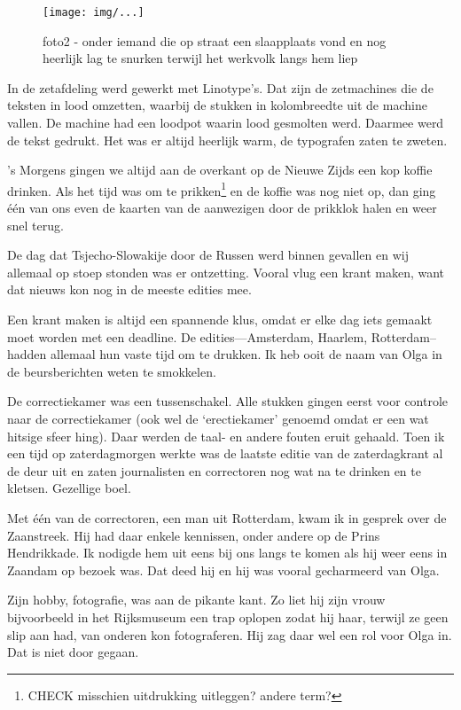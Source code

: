 \documentclass[12pt,twoside]{memoir}
\begin{document}
\begin{figure}[t]
\texttt{[image: img/...]}
\caption{foto2 - onder iemand die op straat een slaapplaats vond en nog heerlijk lag te snurken terwijl het werkvolk langs hem liep}
\end{figure}

In de zetafdeling werd gewerkt met Linotype's. Dat zijn de zetmachines die de teksten in lood omzetten, waarbij de stukken in kolombreedte uit de machine vallen. De machine had een loodpot waarin lood gesmolten werd. Daarmee werd de tekst gedrukt. Het was er altijd heerlijk warm, de typografen zaten te zweten.

's Morgens gingen we altijd aan de overkant op de Nieuwe Zijds een kop koffie drinken. Als het tijd was om te prikken\footnote{CHECK misschien uitdrukking uitleggen? andere term?} en de koffie was nog niet op, dan ging één van ons even de kaarten van de aanwezigen door de prikklok halen en weer snel terug.

De dag dat Tsjecho-Slowakije door de Russen werd 
binnen gevallen en wij allemaal op stoep stonden was er ontzetting. Vooral vlug een krant maken, want dat nieuws kon nog in de meeste edities mee. 

Een krant maken is altijd een spannende klus, omdat er elke dag iets gemaakt moet worden met een deadline. De edities---Amsterdam, Haarlem, Rotterdam--hadden allemaal hun vaste tijd om te drukken. Ik heb ooit de naam van Olga in de beursberichten weten te smokkelen. 

De correctiekamer was een tussenschakel. Alle stukken gingen eerst voor controle naar de correctiekamer (ook wel de `erectiekamer' genoemd omdat er een wat hitsige sfeer hing). Daar werden de taal- en andere fouten eruit gehaald. Toen ik een tijd op zaterdagmorgen werkte was de laatste editie van de zaterdagkrant al de deur uit en zaten journalisten en correctoren nog wat na te drinken en te kletsen. Gezellige boel. 

Met één van de correctoren, een man uit Rotterdam, kwam ik in gesprek over de Zaanstreek. Hij had daar enkele kennissen, onder andere op de Prins Hendrikkade. Ik nodigde hem uit eens bij ons langs te komen als hij weer eens in Zaandam op bezoek was. Dat deed hij en hij was vooral gecharmeerd van Olga. 

Zijn hobby, fotografie, was aan de pikante kant. Zo liet hij  zijn vrouw bijvoorbeeld in het Rijksmuseum een trap oplopen zodat hij haar, terwijl ze geen slip aan had, van onderen kon fotograferen. Hij zag daar wel een rol voor Olga in. Dat is niet door gegaan. 
\end{document}

